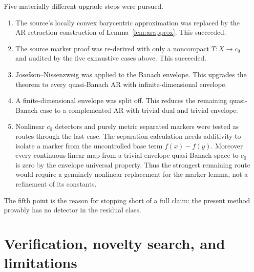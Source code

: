 \documentclass[11pt]{article}
\begin{document}
Five materially different upgrade steps were pursued.
\begin{enumerate}
\item The source's locally convex barycentric approximation was replaced by
the AR retraction construction of Lemma~\ref{lem:arapprox}.  This succeeded.
\item The source marker proof was re-derived with only a noncompact
$T:X\to c_0$ and audited by the five exhaustive cases above.  This succeeded.
\item Josefson--Nissenzweig was applied to the Banach envelope.  This upgrades
the theorem to every quasi-Banach AR with infinite-dimensional envelope.
\item A finite-dimensional envelope was split off.  This reduces the
remaining quasi-Banach case to a complemented AR with trivial dual and
trivial envelope.
\item Nonlinear $c_0$ detectors and purely metric separated markers were
tested as routes through the last case.  The separation calculation needs
additivity to isolate a marker from the uncontrolled base term
$f(x)-f(y)$.  Moreover every continuous linear map from a trivial-envelope
quasi-Banach space to $c_0$ is zero by the envelope universal property.
Thus the strongest remaining route would require a genuinely nonlinear
replacement for the marker lemma, not a refinement of its constants.
\end{enumerate}
The fifth point is the reason for stopping short of a full claim: the present
method provably has no detector in the residual class.

\section{Verification, novelty search, and limitations}
\end{document}
